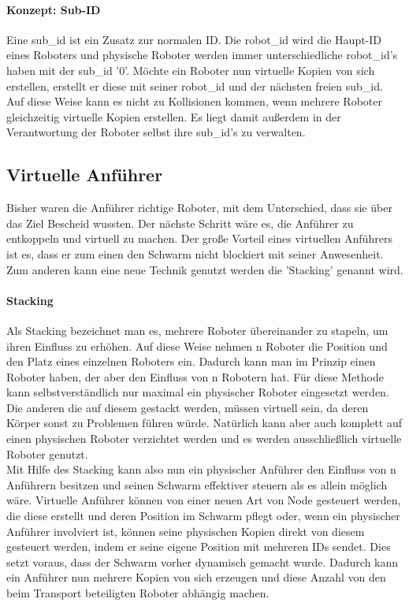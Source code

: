 \paragraph*{Konzept: Sub-ID}
Eine sub\_id ist ein Zusatz zur normalen ID. Die robot\_id wird die Haupt-ID eines Roboters und physische Roboter werden immer unterschiedliche robot\_id's haben mit der sub\_id '0'. Möchte ein Roboter nun virtuelle Kopien von sich erstellen, erstellt er diese mit seiner robot\_id und der nächsten freien sub\_id. Auf diese Weise kann es nicht zu Kollisionen kommen, wenn mehrere Roboter gleichzeitig virtuelle Kopien erstellen. Es liegt damit außerdem in der Verantwortung der Roboter selbst ihre sub\_id's zu verwalten.





\subsection{Virtuelle Anführer}

Bisher waren die Anführer richtige Roboter, mit dem Unterschied, dass sie über das Ziel Bescheid wussten. Der nächste Schritt wäre es, die Anführer zu entkoppeln und virtuell zu machen\cite{RobotLeaderVirtual}.
Der große Vorteil eines virtuellen Anführers ist es, dass er zum einen den Schwarm nicht blockiert mit seiner Anwesenheit. Zum anderen kann eine neue Technik genutzt werden die 'Stacking' genannt wird.

\paragraph*{Stacking}
Als Stacking bezeichnet man es, mehrere Roboter übereinander zu stapeln, um ihren Einfluss zu erhöhen. Auf diese Weise nehmen n Roboter die Position und den Platz eines einzelnen Roboters ein. Dadurch kann man im Prinzip einen Roboter haben, der aber den Einfluss von n Robotern hat. Für diese Methode kann selbstverständlich nur maximal ein physischer Roboter eingesetzt werden. Die anderen die auf diesem gestackt werden, müssen virtuell sein, da deren Körper sonst zu Problemen führen würde. Natürlich kann aber auch komplett auf einen physischen Roboter verzichtet werden und es werden ausschließlich virtuelle Roboter genutzt.\\

Mit Hilfe des Stacking kann also nun ein physischer Anführer den Einfluss von n Anführern besitzen und seinen Schwarm effektiver steuern als es allein möglich wäre. Virtuelle Anführer können von einer neuen Art von Node gesteuert werden, die diese erstellt und deren Position im Schwarm pflegt oder, wenn ein physischer Anführer involviert ist, können seine physischen Kopien direkt von diesem gesteuert werden, indem er seine eigene Position mit mehreren IDs sendet. Dies setzt voraus, dass der Schwarm vorher dynamisch gemacht wurde. Dadurch kann ein Anführer nun mehrere Kopien von sich erzeugen und diese Anzahl von den beim Transport beteiligten Roboter abhängig machen.

